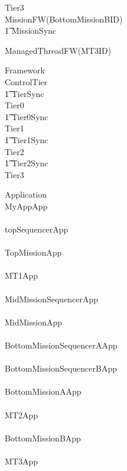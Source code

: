 %
\begin{circus}
\circprocess Tier3 \circdef \\

\circblockopen
	MissionFW(BottomMissionBID)\\
		\t1 	\lpar MissionSync \rpar \\
		\circblockopen



			ManagedThreadFW(MT3ID)\\








		\circblockclose
\circblockclose
\end{circus}
%
%
%
\begin{circus}
\circprocess Framework \circdef \\
\circblockopen
ControlTier \\
\t1 \lpar TierSync \rpar \\
 \circblockopen
Tier0
\\ \t1 \lpar Tier0Sync \rpar \\
Tier1
\\ \t1 \lpar Tier1Sync \rpar \\
Tier2
\\ \t1 \lpar Tier2Sync \rpar \\
Tier3
\circblockclose
\circblockclose
\end{circus}
%
%
\begin{circus}
\circprocess  Application \circdef \\
\circblockopen
MyAppApp\\
\interleave\\
topSequencerApp\\
\interleave \\
		TopMissionApp\\
		\interleave \\
			MT1App\\
			\interleave \\
			MidMissionSequencerApp\\
			
		
		\interleave \\
		MidMissionApp\\
		\interleave \\
			BottomMissionSequencerAApp\\
			\interleave \\
			BottomMissionSequencerBApp\\
			
		
		\interleave \\
		BottomMissionAApp\\
		\interleave \\
			MT2App\\
			
		
		\interleave \\
		BottomMissionBApp\\
		\interleave \\
			MT3App\\
			
		
\circblockclose
\end{circus}
